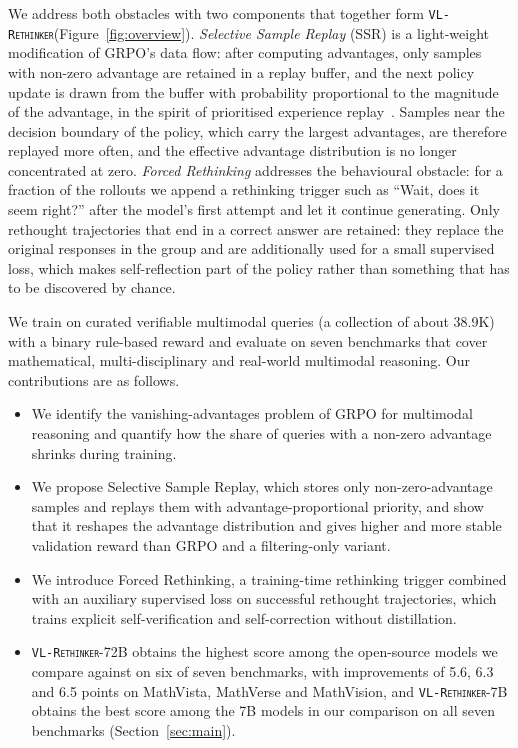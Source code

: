 \documentclass{article}
\newcommand{\model}{\texttt{\textsc{VL-Rethinker}}\xspace}
\begin{document}
We address both obstacles with two components that together form \model (Figure~\ref{fig:overview}). \emph{Selective Sample Replay} (SSR) is a light-weight modification of GRPO's data flow: after computing advantages, only samples with non-zero advantage are retained in a replay buffer, and the next policy update is drawn from the buffer with probability proportional to the magnitude of the advantage, in the spirit of prioritised experience replay~\citep{per}. Samples near the decision boundary of the policy, which carry the largest advantages, are therefore replayed more often, and the effective advantage distribution is no longer concentrated at zero. \emph{Forced Rethinking} addresses the behavioural obstacle: for a fraction of the rollouts we append a rethinking trigger such as ``Wait, does it seem right?'' after the model's first attempt and let it continue generating. Only rethought trajectories that end in a correct answer are retained: they replace the original responses in the group and are additionally used for a small supervised loss, which makes self-reflection part of the policy rather than something that has to be discovered by chance.

We train on curated verifiable multimodal queries (a collection of about 38.9K) with a binary rule-based reward and evaluate on seven benchmarks that cover mathematical, multi-disciplinary and real-world multimodal reasoning. Our contributions are as follows.
\begin{itemize}[leftmargin=*,topsep=2pt,itemsep=1pt]
\item We identify the vanishing-advantages problem of GRPO for multimodal reasoning and quantify how the share of queries with a non-zero advantage shrinks during training.
\item We propose Selective Sample Replay, which stores only non-zero-advantage samples and replays them with advantage-proportional priority, and show that it reshapes the advantage distribution and gives higher and more stable validation reward than GRPO and a filtering-only variant.
\item We introduce Forced Rethinking, a training-time rethinking trigger combined with an auxiliary supervised loss on successful rethought trajectories, which trains explicit self-verification and self-correction without distillation.
\item \model-72B obtains the highest score among the open-source models we compare against on six of seven benchmarks, with improvements of 5.6, 6.3 and 6.5 points on MathVista, MathVerse and MathVision, and \model-7B obtains the best score among the 7B models in our comparison on all seven benchmarks (Section~\ref{sec:main}).
\end{itemize}
\end{document}
